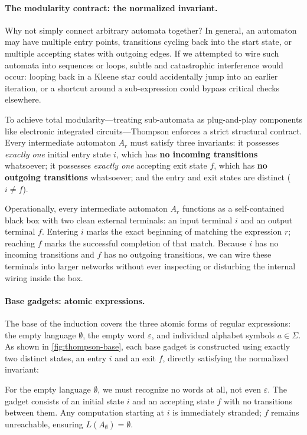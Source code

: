 \paragraph{The modularity contract: the normalized invariant.}
Why not simply connect arbitrary automata together? In general, an automaton may have multiple entry points, transitions cycling back into the start state, or multiple accepting states with outgoing edges. If we attempted to wire such automata into sequences or loops, subtle and catastrophic interference would occur: looping back in a Kleene star could accidentally jump into an earlier iteration, or a shortcut around a sub-expression could bypass critical checks elsewhere.

To achieve total modularity---treating sub-automata as plug-and-play components like electronic integrated circuits---Thompson enforces a strict structural contract. Every intermediate automaton $A_r$ must satisfy three invariants:
it possesses \emph{exactly one} initial entry state $i$, which has \textbf{no incoming transitions} whatsoever;
it possesses \emph{exactly one} accepting exit state $f$, which has \textbf{no outgoing transitions} whatsoever; and
the entry and exit states are distinct ($i \neq f$).

Operationally, every intermediate automaton $A_r$ functions as a self-contained black box with two clean external terminals: an input terminal $i$ and an output terminal $f$. Entering $i$ marks the exact beginning of matching the expression $r$; reaching $f$ marks the successful completion of that match. Because $i$ has no incoming transitions and $f$ has no outgoing transitions, we can wire these terminals into larger networks without ever inspecting or disturbing the internal wiring inside the box.

\paragraph{Base gadgets: atomic expressions.}
The base of the induction covers the three atomic forms of regular expressions: the empty language $\emptyset$, the empty word $\varepsilon$, and individual alphabet symbols $a \in \Sigma$. As shown in \cref{fig:thompson-base}, each base gadget is constructed using exactly two distinct states, an entry $i$ and an exit $f$, directly satisfying the normalized invariant:

For the empty language $\emptyset$, we must recognize no words at all, not even $\varepsilon$. The gadget consists of an initial state $i$ and an accepting state $f$ with no transitions between them. Any computation starting at $i$ is immediately stranded; $f$ remains unreachable, ensuring $L(A_\emptyset) = \emptyset$.

